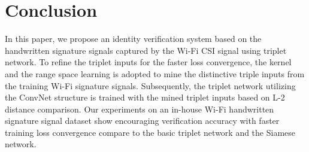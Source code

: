 \documentclass[runningheads]{llncs}
\begin{document}
\section{Conclusion}
In this paper, we propose an identity verification system based on the handwritten signature signals captured by the Wi-Fi CSI signal using triplet network. 
To refine the triplet inputs for the faster loss convergence, the kernel and the range space learning is adopted to mine the distinctive triple inputs from the training Wi-Fi signature signals. 
Subsequently, the triplet network utilizing the ConvNet structure is trained with the mined triplet inputs based on L-2 distance comparison. 
Our experiments on an in-house Wi-Fi handwritten signature signal dataset show encouraging verification accuracy with faster training loss convergence compare to the basic triplet network and the Siamese network.
%
%
%
%
%
%






\end{document}
